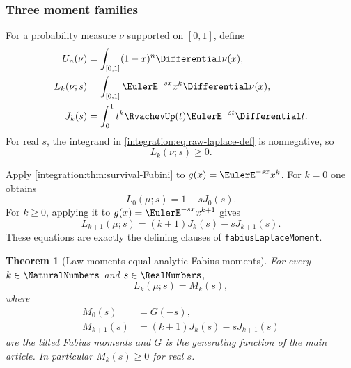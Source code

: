 \documentclass[11pt,oneside]{article}
\newtheorem{theorem}{Theorem}[section]
\theoremstyle{definition}
\theoremstyle{remark}
\newcommand{\lean}[1]{%
  \ifmmode\text{\texttt{\detokenize{#1}}}\else\nolinkurl{#1}\fi}
\begin{document}
\subsubsection{Three moment families}

For a probability measure $\nu$ supported on $[0,1]$, define
\begin{align}
 U_n(\nu)&=\int_{[0,1]}(1-x)^n\Differential\nu(x),                  \label{integration:eq:endpoint-moment-def}\\
 L_k(\nu;s)&=\int_{[0,1]}\EulerE^{-sx}x^k\Differential\nu(x),           \label{integration:eq:raw-laplace-def}\\
 J_k(s)&=\int_0^1t^k\RvachevUp(t)\EulerE^{-st}\Differential t.                 \label{integration:eq:survival-tilt-def}
\end{align}
For real $s$, the integrand in \eqref{integration:eq:raw-laplace-def} is nonnegative, so
\begin{equation}
 L_k(\nu;s)\ge0.
 \label{integration:eq:laplace-moment-nonnegative}
\end{equation}

Apply \cref{integration:thm:survival-Fubini} to $g(x)=\EulerE^{-sx}x^k$.  For $k=0$ one obtains
\begin{equation}
 L_0(\mu;s)=1-sJ_0(s).
 \label{integration:eq:laplace-zero-survival}
\end{equation}
For $k\ge0$, applying it to $g(x)=\EulerE^{-sx}x^{k+1}$ gives
\begin{equation}
 L_{k+1}(\mu;s)=(k+1)J_k(s)-sJ_{k+1}(s).
 \label{integration:eq:laplace-successor-survival}
\end{equation}
These equations are exactly the defining clauses of
\lean{fabiusLaplaceMoment}.

\begin{theorem}[Law moments equal analytic Fabius moments]
\label{integration:thm:law-moments-identification}
For every $k\in\NaturalNumbers$ and $s\in\RealNumbers$,
\begin{equation}
 L_k(\mu;s)=M_k(s),
 \label{integration:eq:law-M-identification}
\end{equation}
where
\begin{align}
 M_0(s)&=G(-s),                                            \label{integration:eq:M-zero}\\
 M_{k+1}(s)&=(k+1)J_k(s)-sJ_{k+1}(s)                      \label{integration:eq:M-successor}
\end{align}
are the tilted Fabius moments and $G$ is the generating function of the main article.
In particular $M_k(s)\ge0$ for real $s$.
\end{theorem}
\end{document}
